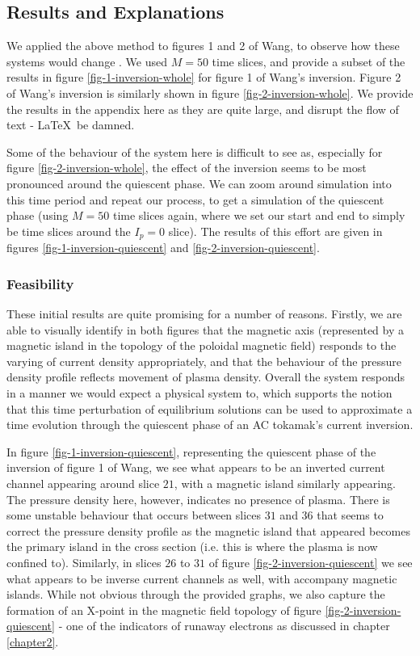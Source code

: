 \subsection{Results and Explanations}

We applied the above method to figures 1 and 2 of Wang, to observe how these systems would change \cite{wang-analytic-solution}. 
We used $M = 50$ time slices, and provide a subset of the results in figure \ref{fig-1-inversion-whole} for figure 1 of Wang's inversion. Figure 
2 of Wang's inversion is similarly shown in figure \ref{fig-2-inversion-whole}. We provide the results in the appendix here as they are quite large, and disrupt 
the flow of text - \LaTeX \, be damned.

Some of the behaviour of the system here is difficult to see as, especially for figure \ref{fig-2-inversion-whole}, the effect of the inversion 
seems to be most pronounced around the quiescent phase. We can zoom around simulation into this time period 
and repeat our process, to get a simulation of the quiescent phase (using $M = 50$ time slices again, where we set our start and end to simply be 
time slices around the $I_p = 0$ slice). The results of this effort are given in figures \ref{fig-1-inversion-quiescent} 
and \ref{fig-2-inversion-quiescent}.

\subsubsection{Feasibility}
These initial results are quite promising for a number of reasons. Firstly, we are able to 
visually identify in both figures that the magnetic axis (represented by a magnetic island 
in the topology of the poloidal magnetic field) responds to the varying of current density appropriately, 
and that the behaviour of the pressure density profile reflects movement of plasma density. 
Overall the system responds in a manner we would expect a physical system to, which supports the 
notion that this time perturbation of equilibrium solutions can be used to approximate a time evolution 
through the quiescent phase of an AC tokamak's current inversion.

In figure \ref{fig-1-inversion-quiescent}, representing the quiescent phase of the inversion of figure 1 of Wang, 
we see what appears to be an inverted current channel appearing around slice $21$, with a magnetic island similarly appearing. 
The pressure density here, however, indicates no presence of plasma. There is some unstable behaviour that 
occurs between slices $31$ and $36$ that seems to correct the pressure density profile as the magnetic island that appeared 
becomes the primary island in the cross section (i.e. this is where the plasma is now confined to). Similarly, in 
slices $26$ to $31$ of figure \ref{fig-2-inversion-quiescent} we see what appears to be inverse current channels as well, 
with accompany magnetic islands. While not obvious through the provided graphs, we also capture the 
formation of an X-point in the magnetic field topology of figure \ref{fig-2-inversion-quiescent} - one of the 
indicators of runaway electrons as discussed in chapter \ref{chapter2}.

